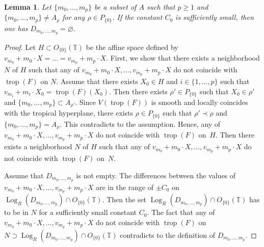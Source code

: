 \documentclass[10pt,a4paper]{amsart}
\numberwithin{equation}{section}
\newtheorem{Lemma}[Theorem]{Lemma}
\begin{document}
\begin{Lemma}\label{lm:oth}
Let $\{m_0, \dots, m_{p}\}$ be a subset of $A$ such that $p \geq 1$ and $\{m_0, \dots, m_{p}\} \neq A_\rho$ for any $\rho \in P_{\{0\}}$. If the constant $C_0$ is sufficiently small, then one has $D_{m_0, \dots, m_p}=\varnothing$.
\end{Lemma}
\begin{proof}
Let $H \subset O_{\{0\}}({\mathbb T})$ be the af\/f\/ine space def\/ined by \mbox{$v_{m_0}+m_0 \cdot X= \dots =v_{m_p}+m_p \cdot X$}.
First, we show that there exists a neighborhood $N$ of $H$ such that any of $v_{m_0}+m_0 \cdot X, \dots, v_{m_p}+m_p \cdot X$ do not coincide with $\operatorname{trop}(F)$ on $N$. Assume that there exists $X_0 \in H$ and $i \in \{1, \dots, p\}$ such that $v_{m_i}+m_i \cdot X_0 = \operatorname{trop}(F)(X_0)$. Then there exists $\rho' \in P_{\{0\}}$ such that \mbox{$X_0 \in \rho'$} and \mbox{$\{m_0, \dots, m_{p}\} \subset A_{\rho'}$}. Since $V(\operatorname{trop}(F))$ is smooth and locally coincides with the tropical hyperplane, there exists $\rho \in P_{\{0\}}$ such that $\rho' \prec \rho$ and $\{m_0, \dots, m_{p}\} = A_{\rho}$. This contradicts to the assumption. Hence, any of $v_{m_0}+m_0 \cdot X, \dots, v_{m_p}+m_p \cdot X$ do not coincide with $\operatorname{trop}(F)$ on~$H$. Then there exists a neighborhood $N$ of $H$ such that any of $v_{m_0}+m_0 \cdot X, \dots, v_{m_p}+m_p \cdot X$ do not coincide with $\operatorname{trop}(F)$ on~$N$.

Assume that $D_{m_0, \dots, m_p}$ is not empty. The dif\/ferences between the values of $v_{m_0}+m_0 \cdot X, \dots, v_{m_p}+m_p \cdot X$ are in the range of $\pm C_0$ on $\operatorname{Log}_R(D_{m_0, \dots, m_p}) \cap O_{\{0\}}({\mathbb T})$. Then the set $\operatorname{Log}_R(D_{m_0, \dots, m_p}) \cap O_{\{0\}}({\mathbb T})$ has to be in $N$ for a suf\/f\/iciently small constant $C_0$. The fact that any of $v_{m_0}+m_0 \cdot X, \dots, v_{m_p}+m_p \cdot X$ do not coincide with $\operatorname{trop}(F)$ on $N \supset \operatorname{Log}_R(D_{m_0, \dots, m_p}) \cap O_{\{0\}}({\mathbb T})$ contradicts to the def\/inition of $D_{m_0, \dots, m_p}$.
\end{proof}
\end{document}

